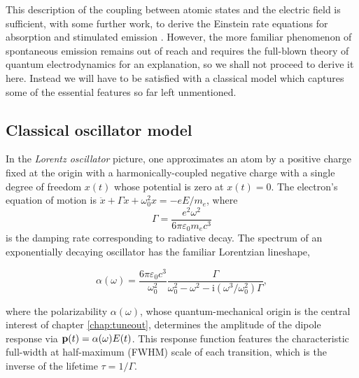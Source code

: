 	

	This description of the coupling between atomic states and the electric field is sufficient, with some further work, to derive the Einstein rate equations for absorption and stimulated emission \cite{FootAtomic}.
	However, the more familiar phenomenon of spontaneous emission remains out of reach and requires the full-blown theory of quantum electrodynamics for an explanation, so we shall not proceed to derive it here.
	Instead we will have to be satisfied with a classical model which captures some of the essential features so far left unmentioned.



	\subsection*{Classical oscillator model}
	
	

	In the \emph{Lorentz oscillator} picture, one approximates an atom by a positive charge fixed at the origin with a harmonically-coupled negative charge with a single degree of freedom $x(t)$ whose potential is zero at $x(t)=0$.
	The electron's equation of motion is $\ddot{x} + \Gamma\dot{x} + \omega_0^2x = -e E/m_e$, where
	\begin{equation}
		\Gamma = \frac{e^2\omega^2}{6\pi \varepsilon_0 m_e c^3}
	\end{equation}
	is the damping rate corresponding to radiative decay.
	The spectrum of an exponentially decaying oscillator has the familiar Lorentzian lineshape,

	\begin{equation}
		\alpha(\omega) = \frac{6\pi\varepsilon_0c^3}{\omega_0^2}\frac{\Gamma}{\omega_0^2-\omega^2-\textrm{i}(\omega^3/\omega_0^2)\Gamma},
		\label{eqn:lorentzian}
	\end{equation}

	where the polarizability $\alpha(\omega)$, whose quantum-mechanical origin is the central interest of chapter \ref{chap:tuneout}, determines the amplitude of the dipole response via $\textbf{p}(t) = \alpha(\omega)E(t)$.
	This response function features the characteristic full-width at half-maximum (FWHM) scale of each transition, which is the inverse of the lifetime $\tau=1/\Gamma$.



